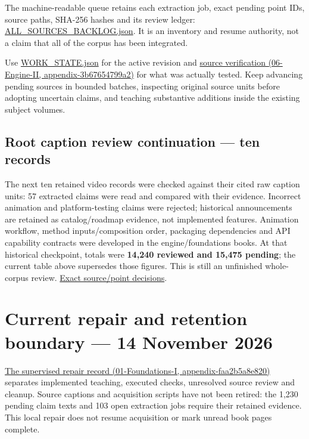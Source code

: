 The machine-readable queue retains each extraction job, exact pending point IDs, source paths, SHA-256 hashes and its review ledger: \href{/Users/swayamsingal/.codex/source-cache/manual-integration-2026-11-10/ALL_SOURCES_BACKLOG.json}{ALL\_SOURCES\_BACKLOG.json}. It is an inventory and resume authority, not a claim that all of the corpus has been integrated.

Use \href{/Users/swayamsingal/.codex/source-cache/manual-integration-2026-11-10/WORK_STATE.json}{WORK\_STATE.json} for the active revision and \href{../06-Engine-II/main.pdf\#nameddest=appendix-3b67654799a2}{source verification (06-Engine-II, appendix-3b67654799a2)} for what was actually tested. Keep advancing pending sources in bounded batches, inspecting original source units before adopting uncertain claims, and teaching substantive additions inside the existing subject volumes.

\subsection{Root caption review continuation --- ten records}\label{appendix-ac1f51db5e9a-root-caption-review-continuation-ten-records}

The next ten retained video records were checked against their cited raw caption units: 57 extracted claims were read and compared with their evidence. Incorrect animation and platform-testing claims were rejected; historical announcements are retained as catalog/roadmap evidence, not implemented features. Animation workflow, method inputs/composition order, packaging dependencies and API capability contracts were developed in the engine/foundations books. At that historical checkpoint, totals were \textbf{14,240 reviewed and 15,475 pending}; the current table above supersedes those figures. This is still an unfinished whole-corpus review. \href{/Users/swayamsingal/.codex/source-cache/manual-integration-2026-11-10/math-repair-2026-11-11/caption-batch-01-review.json}{Exact source/point decisions}.

\section{Current repair and retention boundary --- 14 November 2026}\label{appendix-ac1f51db5e9a-current-repair-and-retention-boundary-14-november-2026}

\href{../01-Foundations-I/main.pdf\#nameddest=appendix-faa2b5a8e820}{The supervised repair record (01-Foundations-I, appendix-faa2b5a8e820)} separates implemented teaching, executed checks, unresolved source review and cleanup. Source captions and acquisition scripts have not been retired: the 1,230 pending claim texts and 103 open extraction jobs require their retained evidence. This local repair does not resume acquisition or mark unread book pages complete.

